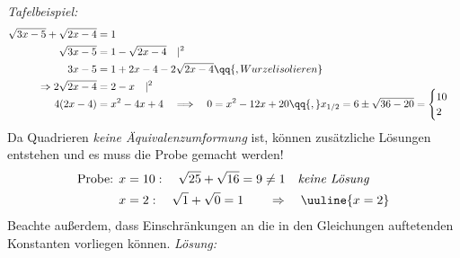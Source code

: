 \emph{Tafelbeispiel:}
\begin{align}
    \sqrt{3x-5} + \sqrt{2x-4} &= 1 \\
    \sqrt{3x-5} &= 1 - \sqrt{2x-4} \quad |^2 \\
    3x-5 &= 1 + 2x-4 - 2 \sqrt{2x-4} \qq{, Wurzel isolieren }\\
    \Rightarrow 2 \sqrt{2x-4} &= 2-x \quad |^2 \\[-3mm]
    4(2x-4) &= x^2 -4x +4 \quad \Longrightarrow \quad 0 = x^2 - 12x +20 \qq{,} x_{1/2} = 6\pm \sqrt{36-20} = \begin{cases}
        10 \\ 2
    \end{cases} 
\end{align}
Da Quadrieren \emph{keine Äquivalenzumformung} ist, können zusätzliche Lösungen entstehen und es muss die Probe gemacht werden! 
\begin{align}
    \text{Probe: }& x=10: \quad \sqrt{25} + \sqrt{16} = 9 \neq 1  \quad\emph{keine Lösung} \\
    & x=2: \quad \sqrt{1} +\sqrt{0} = 1 \qquad \Rightarrow \quad \uuline{x=2}
\end{align}
Beachte außerdem, dass Einschränkungen an die in den Gleichungen auftetenden Konstanten vorliegen können.
\emph{Lösung:}
